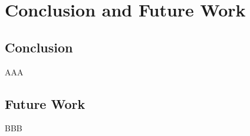 
%
%


\chapter{Conclusion and Future Work}
\label{ch:conclusion}

%




\section{Conclusion}

AAA


\section{Future Work}

BBB

